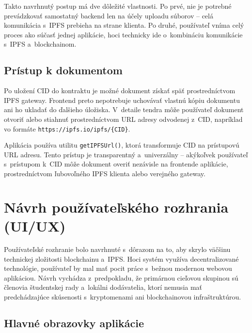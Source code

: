 Takto navrhnutý postup má dve dôležité vlastnosti. Po prvé, nie je
potrebné prevádzkovať samostatný backend len na účely uploadu súborov --
celá komunikácia s~IPFS prebieha na strane klienta. Po druhé, používateľ
vníma celý proces ako súčasť jednej aplikácie, hoci technicky ide
o~kombináciu komunikácie s~IPFS a~blockchainom.

\subsection{Prístup k dokumentom}
\label{subsec:document_access}

Po uložení CID do kontraktu je možné dokument získať späť prostredníctvom
IPFS gateway. Frontend preto nepotrebuje uchovávať vlastnú kópiu dokumentu
ani ho ukladať do ďalšieho úložiska. V~detaile tendra môže používateľ
dokument otvoriť alebo stiahnuť prostredníctvom URL adresy odvodenej z~CID,
napríklad vo formáte \texttt{https://ipfs.io/ipfs/\{CID\}}.

Aplikácia používa utilitu \texttt{getIPFSUrl()}, ktorá transformuje CID
na prístupovú URL adresu. Tento prístup je transparentný a~univerzálny --
akýkoľvek používateľ s~prístupom k~CID môže dokument overiť nezávisle
na frontende aplikácie, prostredníctvom ľubovoľného IPFS klienta alebo
verejného gateway.

\section{Návrh používateľského rozhrania (UI/UX)}
\label{sec:ui_design}

Používateľské rozhranie bolo navrhnuté s~dôrazom na to, aby skrylo
väčšinu technickej zložitosti blockchainu a~IPFS. Hoci systém využíva
decentralizované technológie, používateľ by mal mať pocit práce s~bežnou
modernou webovou aplikáciou. Návrh vychádza z~predpokladu, že primárnou
cieľovou skupinou sú členovia študentskej rady a~lokálni dodávatelia, ktorí
nemusia mať predchádzajúce skúsenosti s~kryptomenami ani blockchainovou
infraštruktúrou.

\subsection{Hlavné obrazovky aplikácie}
\label{subsec:screens}

